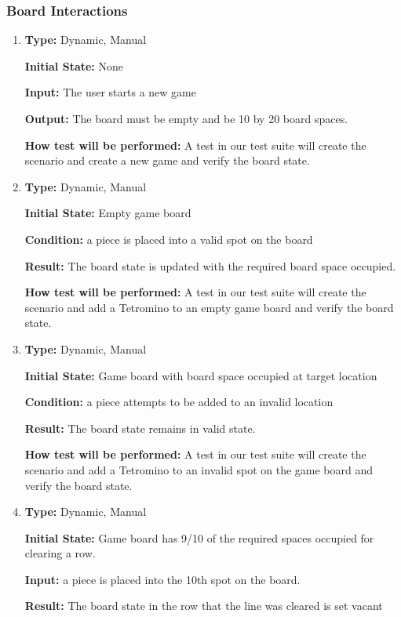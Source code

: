 \documentclass[12pt, titlepage]{article}
\begin{document}
	\subsubsection{Board Interactions}
	\begin{enumerate}[{FR-BI-}1. ]
		\item
		\textbf{Type:} Dynamic, Manual
		
		\textbf{Initial State:} None
		
		\textbf{Input:} The user starts a new game
		
		\textbf{Output:} The board must be empty and be 10 by 20 board spaces.
		
		\textbf{How test will be performed:} A test in our test suite will create the scenario and create a new game and verify the board state.
		
		\item
		\textbf{Type:} Dynamic, Manual
		
		\textbf{Initial State:} Empty game board
		
		\textbf{Condition:} a piece is placed into a valid spot on the board
		
		\textbf{Result:} The board state is updated with the required board space occupied. 
		
		\textbf{How test will be performed:} A test in our test suite will create the scenario and add a Tetromino to an empty game board and verify the board state.
		
		\item
		\textbf{Type:} Dynamic, Manual
		
		\textbf{Initial State:} Game board with board space occupied at target location
		
		\textbf{Condition:} a piece attempts to be added to an invalid location
		
		\textbf{Result:} The board state remains in valid state. 
		
		\textbf{How test will be performed:} A test in our test suite will create the scenario and add a Tetromino to an invalid spot on the game board and verify the board state.
		
		\item
		\textbf{Type:} Dynamic, Manual
		
		\textbf{Initial State:} Game board has 9/10 of the required spaces occupied for clearing a row.
		
		\textbf{Input:} a piece is placed into the 10th spot on the board.
		
		\textbf{Result:} The board state in the row that the line was cleared is set vacant
		

\end{enumerate}
\end{document}
